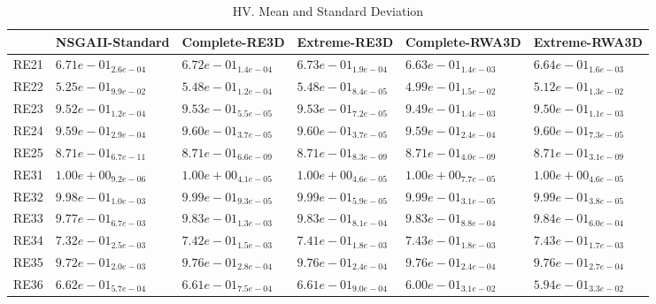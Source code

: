 \documentclass{article}
\begin{document}
\begin{table}
\caption{HV. Mean and Standard Deviation}
\label{table: HV}
\centering
\begin{scriptsize}
\begin{tabular}{llllll}
\hline & NSGAII-Standard & Complete-RE3D & Extreme-RE3D & Complete-RWA3D &  Extreme-RWA3D\\
\hline 
RE21 & $  6.71e-01_{ 2.6e-04}$ & \cellcolor{gray25}$  6.72e-01_{ 1.4e-04}$ & \cellcolor{gray95}$  6.73e-01_{ 1.9e-04}$ & $  6.63e-01_{ 1.4e-03}$ & $  6.64e-01_{ 1.6e-03}$ \\
RE22 & $  5.25e-01_{ 9.9e-02}$ & \cellcolor{gray25}$  5.48e-01_{ 1.2e-04}$ & \cellcolor{gray95}$  5.48e-01_{ 8.4e-05}$ & $  4.99e-01_{ 1.5e-02}$ & $  5.12e-01_{ 1.3e-02}$ \\
RE23 & $  9.52e-01_{ 1.2e-04}$ & \cellcolor{gray95}$  9.53e-01_{ 5.5e-05}$ & \cellcolor{gray25}$  9.53e-01_{ 7.2e-05}$ & $  9.49e-01_{ 1.4e-03}$ & $  9.50e-01_{ 1.1e-03}$ \\
RE24 & $  9.59e-01_{ 2.9e-04}$ & \cellcolor{gray25}$  9.60e-01_{ 3.7e-05}$ & \cellcolor{gray95}$  9.60e-01_{ 3.7e-05}$ & $  9.59e-01_{ 2.4e-04}$ & $  9.60e-01_{ 7.3e-05}$ \\
RE25 & \cellcolor{gray95}$  8.71e-01_{ 6.7e-11}$ & $  8.71e-01_{ 6.6e-09}$ & $  8.71e-01_{ 8.3e-09}$ & $  8.71e-01_{ 4.0e-09}$ & \cellcolor{gray25}$  8.71e-01_{ 3.1e-09}$ \\
RE31 & \cellcolor{gray95}$  1.00e+00_{ 9.2e-06}$ & $  1.00e+00_{ 4.1e-05}$ & \cellcolor{gray25}$  1.00e+00_{ 4.6e-05}$ & $  1.00e+00_{ 7.7e-05}$ & $  1.00e+00_{ 4.6e-05}$ \\
RE32 & $  9.98e-01_{ 1.0e-03}$ & $  9.99e-01_{ 9.3e-05}$ & $  9.99e-01_{ 5.9e-05}$ & \cellcolor{gray25}$  9.99e-01_{ 3.1e-05}$ & \cellcolor{gray95}$  9.99e-01_{ 3.8e-05}$ \\
RE33 & $  9.77e-01_{ 6.7e-03}$ & $  9.83e-01_{ 1.3e-03}$ & $  9.83e-01_{ 8.1e-04}$ & \cellcolor{gray25}$  9.83e-01_{ 8.8e-04}$ & \cellcolor{gray95}$  9.84e-01_{ 6.0e-04}$ \\
RE34 & $  7.32e-01_{ 2.5e-03}$ & $  7.42e-01_{ 1.5e-03}$ & $  7.41e-01_{ 1.8e-03}$ & \cellcolor{gray95}$  7.43e-01_{ 1.8e-03}$ & \cellcolor{gray25}$  7.43e-01_{ 1.7e-03}$ \\
RE35 & $  9.72e-01_{ 2.0e-03}$ & \cellcolor{gray25}$  9.76e-01_{ 2.8e-04}$ & $  9.76e-01_{ 2.4e-04}$ & \cellcolor{gray95}$  9.76e-01_{ 2.4e-04}$ & $  9.76e-01_{ 2.7e-04}$ \\
RE36 & \cellcolor{gray95}$  6.62e-01_{ 5.7e-04}$ & \cellcolor{gray25}$  6.61e-01_{ 7.5e-04}$ & $  6.61e-01_{ 9.0e-04}$ & $  6.00e-01_{ 3.1e-02}$ & $  5.94e-01_{ 3.3e-02}$ \\

\end{tabular}
\end{scriptsize}
\end{table}
\end{document}
